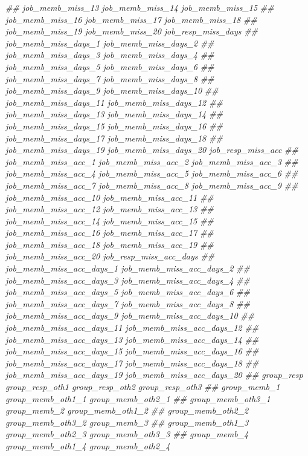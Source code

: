 \documentclass[
]{article}
\newenvironment{Shaded}{\begin{snugshade}}{\end{snugshade}}
\newcommand{\CommentTok}[1]{\textcolor[rgb]{0.56,0.35,0.01}{\textit{#1}}}
\begin{document}
\begin{Shaded}
\begin{Highlighting}[]
\CommentTok{##      job_memb_miss_13 job_memb_miss_14 job_memb_miss_15}
\CommentTok{##      job_memb_miss_16 job_memb_miss_17 job_memb_miss_18}
\CommentTok{##      job_memb_miss_19 job_memb_miss_20 job_resp_miss_days}
\CommentTok{##      job_memb_miss_days_1 job_memb_miss_days_2}
\CommentTok{##      job_memb_miss_days_3 job_memb_miss_days_4}
\CommentTok{##      job_memb_miss_days_5 job_memb_miss_days_6}
\CommentTok{##      job_memb_miss_days_7 job_memb_miss_days_8}
\CommentTok{##      job_memb_miss_days_9 job_memb_miss_days_10}
\CommentTok{##      job_memb_miss_days_11 job_memb_miss_days_12}
\CommentTok{##      job_memb_miss_days_13 job_memb_miss_days_14}
\CommentTok{##      job_memb_miss_days_15 job_memb_miss_days_16}
\CommentTok{##      job_memb_miss_days_17 job_memb_miss_days_18}
\CommentTok{##      job_memb_miss_days_19 job_memb_miss_days_20 job_resp_miss_acc}
\CommentTok{##      job_memb_miss_acc_1 job_memb_miss_acc_2 job_memb_miss_acc_3}
\CommentTok{##      job_memb_miss_acc_4 job_memb_miss_acc_5 job_memb_miss_acc_6}
\CommentTok{##      job_memb_miss_acc_7 job_memb_miss_acc_8 job_memb_miss_acc_9}
\CommentTok{##      job_memb_miss_acc_10 job_memb_miss_acc_11}
\CommentTok{##      job_memb_miss_acc_12 job_memb_miss_acc_13}
\CommentTok{##      job_memb_miss_acc_14 job_memb_miss_acc_15}
\CommentTok{##      job_memb_miss_acc_16 job_memb_miss_acc_17}
\CommentTok{##      job_memb_miss_acc_18 job_memb_miss_acc_19}
\CommentTok{##      job_memb_miss_acc_20 job_resp_miss_acc_days}
\CommentTok{##      job_memb_miss_acc_days_1 job_memb_miss_acc_days_2}
\CommentTok{##      job_memb_miss_acc_days_3 job_memb_miss_acc_days_4}
\CommentTok{##      job_memb_miss_acc_days_5 job_memb_miss_acc_days_6}
\CommentTok{##      job_memb_miss_acc_days_7 job_memb_miss_acc_days_8}
\CommentTok{##      job_memb_miss_acc_days_9 job_memb_miss_acc_days_10}
\CommentTok{##      job_memb_miss_acc_days_11 job_memb_miss_acc_days_12}
\CommentTok{##      job_memb_miss_acc_days_13 job_memb_miss_acc_days_14}
\CommentTok{##      job_memb_miss_acc_days_15 job_memb_miss_acc_days_16}
\CommentTok{##      job_memb_miss_acc_days_17 job_memb_miss_acc_days_18}
\CommentTok{##      job_memb_miss_acc_days_19 job_memb_miss_acc_days_20}
\CommentTok{##      group_resp group_resp_oth1 group_resp_oth2 group_resp_oth3}
\CommentTok{##      group_memb_1 group_memb_oth1_1 group_memb_oth2_1}
\CommentTok{##      group_memb_oth3_1 group_memb_2 group_memb_oth1_2}
\CommentTok{##      group_memb_oth2_2 group_memb_oth3_2 group_memb_3}
\CommentTok{##      group_memb_oth1_3 group_memb_oth2_3 group_memb_oth3_3}
\CommentTok{##      group_memb_4 group_memb_oth1_4 group_memb_oth2_4}

\end{Highlighting}
\end{Shaded}
\end{document}
